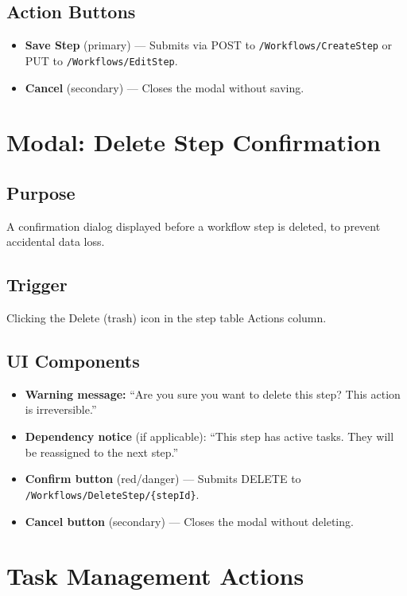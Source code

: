 \documentclass[12pt]{article}
\begin{document}
\subsection{Action Buttons}
\begin{itemize}
    \item \textbf{Save Step} (primary) --- Submits via POST to
    \texttt{/Workflows/CreateStep} or PUT to \texttt{/Workflows/EditStep}.
    \item \textbf{Cancel} (secondary) --- Closes the modal without saving.
\end{itemize}

\section{Modal: Delete Step Confirmation}

\subsection{Purpose}
A confirmation dialog displayed before a workflow step is deleted, to prevent accidental
data loss.

\subsection{Trigger}
Clicking the Delete (trash) icon in the step table Actions column.

\subsection{UI Components}
\begin{itemize}
    \item \textbf{Warning message:} ``Are you sure you want to delete this step? This action
    is irreversible.''
    \item \textbf{Dependency notice} (if applicable): ``This step has active tasks. They will
    be reassigned to the next step.''
    \item \textbf{Confirm button} (red/danger) --- Submits DELETE to
    \texttt{/Workflows/DeleteStep/\{stepId\}}.
    \item \textbf{Cancel button} (secondary) --- Closes the modal without deleting.
\end{itemize}

\section{Task Management Actions}
\end{document}
